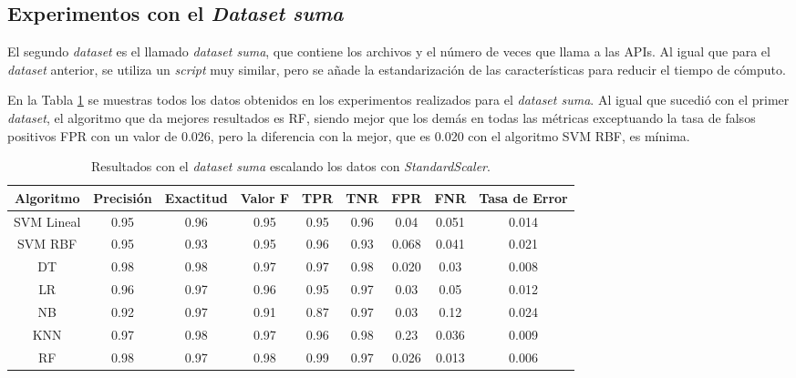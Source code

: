 \subsection{Experimentos con el \textit{Dataset suma}} \label{sec:exp2}

\noindent El segundo \textit{dataset} es el llamado \textit{dataset suma}, que contiene los archivos y el número de veces que llama a las \gls{API}s. Al igual que para el \textit{dataset} anterior, se utiliza un \textit{script} muy similar, pero se añade la estandarización de las características para reducir el tiempo de cómputo.


En la Tabla \ref{tab:rto_suma_nokfold} se muestras todos los datos obtenidos en los experimentos realizados para el \textit{dataset suma}. Al igual que sucedió con el primer \textit{dataset}, el algoritmo que da mejores resultados es \gls{RF}, siendo mejor que los demás en todas las métricas exceptuando la tasa de falsos positivos \gls{FPR} con un valor de 0.026, pero la diferencia con la mejor, que es 0.020 con el algoritmo \gls{SVM} \gls{RBF}, es mínima.

\begin{table}[h!]
    \centering
    \scriptsize %
    \caption{Resultados con el \textit{dataset suma} escalando los datos con \textit{StandardScaler}.}
    \begin{tabular}{|c|c|c|c|c|c|c|c|c|}
        \hline
        \rowcolor[HTML]{C0C0C0} 
        \textbf{Algoritmo} & \textbf{Precisión} & \textbf{Exactitud} & \textbf{Valor F} & \textbf{\gls{TPR}} & \textbf{\gls{TNR}} & \textbf{\gls{FPR}} & \textbf{\gls{FNR}} & \textbf{Tasa de Error}\\ \hline
        
        \gls{SVM} Lineal & 0.95 & 0.96 & 0.95 & 0.95 & 0.96 & 0.04 & 0.051 & 0.014\\ \hline
        \gls{SVM} \gls{RBF} & 0.95 & 0.93 & 0.95 & 0.96 & 0.93 & 0.068 & 0.041 & 0.021\\ \hline
        \gls{DT} & 0.98 & 0.98 & 0.97 & 0.97 & 0.98 & 0.020 & 0.03 & 0.008\\ \hline
        \gls{LR} & 0.96 & 0.97 & 0.96 & 0.95 & 0.97 & 0.03 & 0.05 & 0.012\\ \hline
        \gls{NB} & 0.92 & 0.97 & 0.91 & 0.87 & 0.97 & 0.03 & 0.12 & 0.024\\ \hline
        \gls{KNN} & 0.97 & 0.98 & 0.97 & 0.96 & 0.98 & 0.23 & 0.036 & 0.009\\ \hline
        \gls{RF} & 0.98 & 0.97 & 0.98 & 0.99 & 0.97 & 0.026 & 0.013 & 0.006\\ \hline
        
    \end{tabular}
    \label{tab:rto_suma_nokfold}
\end{table}

